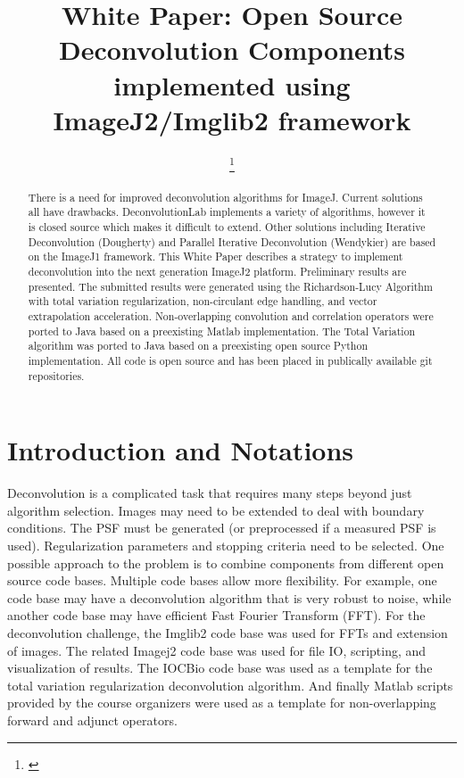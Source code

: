 \documentclass[conference,a4paper]{IEEEtran}
\title{White Paper: Open Source Deconvolution Components implemented
using ImageJ2/Imglib2 framework}
\author{
	\IEEEauthorblockN{
		Brian Northan\IEEEauthorrefmark{1},
	}

	\IEEEauthorblockA{\IEEEauthorrefmark{1} True North Intelligent Algorithms, Guilderland, New York}

	\thanks{\textit{}}
}
\begin{document}
\maketitle

\begin{abstract}
There is a need for improved deconvolution algorithms for ImageJ.
Current solutions all have drawbacks.  DeconvolutionLab implements a
variety of algorithms, however it is closed source which makes it
difficult to extend.  Other solutions including Iterative Deconvolution
(Dougherty) and Parallel Iterative Deconvolution (Wendykier) are based
on the ImageJ1 framework.  This White Paper describes a strategy to
implement deconvolution into the next generation ImageJ2 platform.
Preliminary results are presented.  The submitted results were generated
using the Richardson-Lucy Algorithm with total variation regularization, non-circulant
edge handling, and vector extrapolation acceleration.  Non-overlapping
convolution and correlation operators were ported to Java based on a
preexisting Matlab implementation.  The Total Variation algorithm was
ported to Java based on a preexisting open source Python implementation.
All code is open source and has been placed in publically available git
repositories.  
\end{abstract}


\section{Introduction and Notations}

Deconvolution is a complicated task that requires many steps beyond just algorithm selection.   Images may need to be extended to deal with boundary conditions.  The PSF must be generated (or preprocessed if a measured PSF is used).  Regularization parameters and stopping criteria need to be selected.  One possible approach to the problem is to combine components from different open source code bases.  Multiple code bases allow more flexibility.  For example, one code base may have a deconvolution algorithm that is very robust to noise, while another code base may have efficient Fast Fourier Transform (FFT).  For the deconvolution challenge, the Imglib2 code base \cite{imglib2012} was used for FFTs and extension of images.  The related Imagej2 code base \cite{imagej2013} was used for file IO, scripting, and visualization of results.  The IOCBio \cite{laasmaa2011} code base was used as a template for the total variation regularization deconvolution algorithm.  And finally Matlab scripts provided by the course organizers \cite{vonesch2013} were used as a template for non-overlapping forward and adjunct operators. 
\end{document}
